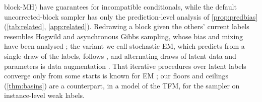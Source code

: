 block-MH) have guarantees for incompatible conditionals, while the default uncorrected-block sampler has only the
prediction-level analysis of \cref{prop:predbias} (\cref{tab:related}, \cref{app:related}). Redrawing a block given the
others' current labels resembles Hogwild and asynchronous Gibbs sampling, whose bias and mixing have been analysed
\citep{johnson2013hogwild,desa2016asyncgibbs}; the variant we call stochastic EM, which predicts from a single draw
of the labels, follows \citet{celeux1985sem}, and alternating draws of latent data and parameters is data augmentation
\citep{tanner1987da}. That iterative procedures
over latent labels converge only from some starts is known for EM \citep{balakrishnan2014em}; our floors and ceilings
(\cref{thm:basins}) are a counterpart, in a model of the TFM, for the sampler on instance-level weak labels.
